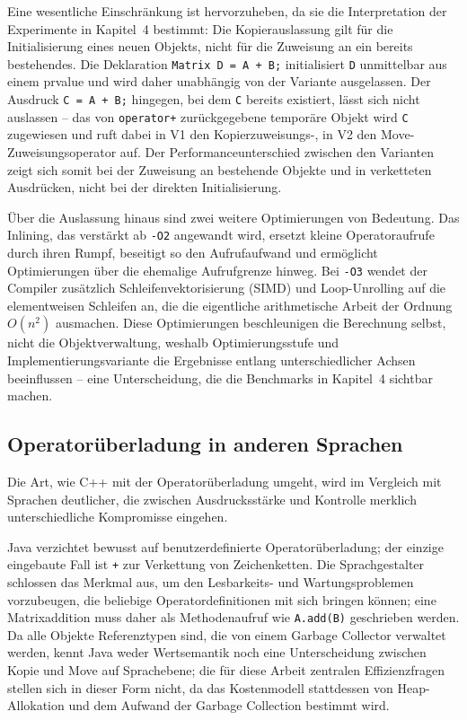 \documentclass[10pt,a4paper]{article}
\begin{document}
Eine wesentliche Einschränkung ist hervorzuheben, da sie die
Interpretation der Experimente in Kapitel~4 bestimmt: Die
Kopierauslassung gilt für die Initialisierung eines neuen Objekts, nicht
für die Zuweisung an ein bereits bestehendes. Die Deklaration
\texttt{Matrix D = A + B;} initialisiert \texttt{D} unmittelbar aus
einem prvalue und wird daher unabhängig von der Variante ausgelassen.
Der Ausdruck \texttt{C = A + B;} hingegen, bei dem \texttt{C} bereits
existiert, lässt sich nicht auslassen -- das von \texttt{operator+}
zurückgegebene temporäre Objekt wird \texttt{C} zugewiesen und ruft
dabei in V1 den Kopierzuweisungs-, in V2 den Move-Zuweisungsoperator
auf. Der Performanceunterschied zwischen den Varianten zeigt sich somit
bei der Zuweisung an bestehende Objekte und in verketteten Ausdrücken,
nicht bei der direkten Initialisierung.

Über die Auslassung hinaus sind zwei weitere Optimierungen von
Bedeutung. Das Inlining, das verstärkt ab \texttt{-O2} angewandt wird,
ersetzt kleine Operatoraufrufe durch ihren Rumpf, beseitigt so den
Aufrufaufwand und ermöglicht Optimierungen über die ehemalige
Aufrufgrenze hinweg. Bei \texttt{-O3} wendet der Compiler zusätzlich
Schleifenvektorisierung (SIMD) und Loop-Unrolling auf die elementweisen
Schleifen an, die die eigentliche arithmetische Arbeit der Ordnung
\(O(n^2)\) ausmachen. Diese Optimierungen beschleunigen die Berechnung
selbst, nicht die Objektverwaltung, weshalb Optimierungsstufe und
Implementierungsvariante die Ergebnisse entlang unterschiedlicher Achsen
beeinflussen -- eine Unterscheidung, die die Benchmarks in Kapitel~4
sichtbar machen.

\subsection{Operatorüberladung in anderen Sprachen}

Die Art, wie C++ mit der Operatorüberladung umgeht, wird im Vergleich
mit Sprachen deutlicher, die zwischen Ausdrucksstärke und Kontrolle
merklich unterschiedliche Kompromisse eingehen.

Java verzichtet bewusst auf benutzerdefinierte Operatorüberladung; der
einzige eingebaute Fall ist \texttt{+} zur Verkettung von
Zeichenketten. Die Sprachgestalter schlossen das Merkmal aus, um den
Lesbarkeits- und Wartungsproblemen vorzubeugen, die beliebige
Operatordefinitionen mit sich bringen können; eine Matrixaddition muss
daher als Methodenaufruf wie \texttt{A.add(B)} geschrieben werden. Da
alle Objekte Referenztypen sind, die von einem Garbage Collector
verwaltet werden, kennt Java weder Wertsemantik noch eine
Unterscheidung zwischen Kopie und Move auf Sprachebene; die für diese
Arbeit zentralen Effizienzfragen stellen sich in dieser Form nicht, da
das Kostenmodell stattdessen von Heap-Allokation und dem Aufwand der
Garbage Collection bestimmt wird.
\end{document}
